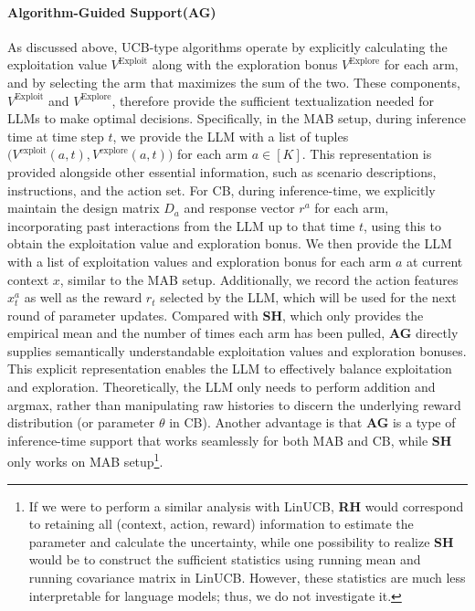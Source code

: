 \documentclass[11pt, logo]{googledeepmind}
\newcommand{\ag}{Algorithm-Guided Support\xspace}
\theoremstyle{plain}
\theoremstyle{definition}
\begin{document}
\paragraph{\ag (AG)} As discussed above, UCB-type algorithms operate by explicitly calculating the exploitation value $V^\text{Exploit}$ along with the exploration bonus $V^\text{Explore}$ for each arm, and by selecting the arm that maximizes the sum of the two. These components, $V^\text{Exploit}$ and $V^\text{Explore}$, therefore provide the sufficient textualization needed for LLMs to make optimal decisions.
Specifically, in the MAB setup, during inference time at time step $t$, we provide the LLM with a list of tuples $\big(V^{\text{exploit}}(a,t), V^{\text{explore}}(a,t)\big)$ for each arm $a\in[K]$. This representation is provided alongside  other essential information, such as scenario descriptions, instructions, and the action set.
For CB, during inference-time, we explicitly maintain the design matrix $D_a$ and response vector $r^a$ for each arm, incorporating past interactions from the LLM up to that time $t$, using this to obtain the exploitation value and exploration bonus. We then provide the LLM with a list of exploitation values and exploration bonus for each arm $a$ at current context $x$, similar to the MAB setup. Additionally, we record the action features $x^a_t$ as well as the reward $r_t$ selected by the LLM, which will be used for the next round of parameter updates.
Compared with \textbf{SH}, which only provides the empirical mean and the number of times each arm has been pulled, \textbf{AG} directly supplies semantically understandable exploitation values and exploration bonuses. This explicit representation enables the LLM to effectively balance exploitation and exploration.  Theoretically, the LLM only needs to perform addition and argmax, rather than manipulating raw histories to discern the underlying reward distribution (or parameter $\theta$ in CB). Another advantage is that \textbf{AG} is a type of inference-time support that works seamlessly for both MAB and CB, while \textbf{SH} only works on MAB setup\footnote{If we were to perform a similar analysis with LinUCB, \textbf{RH} would correspond to retaining all (context, action, reward) information to estimate the parameter and calculate the uncertainty, while one possibility to realize \textbf{SH} would be to construct the sufficient statistics using running mean and running covariance matrix in LinUCB. However, these statistics are much less interpretable for language models; thus, we do not investigate it.}.
\end{document}
